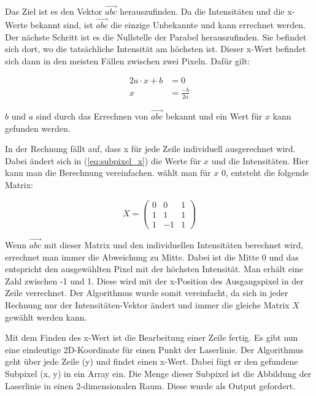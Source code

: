 		Das Ziel ist es den Vektor \( \vec{abc} \) herauszufinden. Da die Intensitäten und die x-Werte bekannt sind, ist \( \vec{abc} \) die einzige Unbekannte und kann errechnet werden. Der nächste Schritt ist es die Nullstelle der Parabel herauszufinden. Sie befindet sich dort, wo die tatsächliche Intensität am höchsten ist. Dieser x-Wert befindet sich dann in den meisten Fällen zwischen zwei Pixeln. Dafür gilt:
		
		\begin{equation}
			\begin{aligned}
				2a \cdot x + b &= 0 \\
				x &= \frac{-b}{2a}
			\end{aligned}
		\end{equation}
	
		\( b \) und \( a \) sind durch das Errechnen von \( \vec{abc} \) bekannt und ein Wert für \( x \) kann gefunden werden.
		
		In der Rechnung fällt auf, dass x für jede Zeile individuell ausgerechnet wird. Dabei ändert sich in (\ref{eq:subpixel_x}) die Werte für \( x \) und die Intensitäten. Hier kann man die Berechnung vereinfachen. wählt man für \( x \) 0, entsteht die folgende Matrix:
		
		\begin{equation}
			X = \begin{pmatrix}
				0 & 0 & 1 \\
				1 & 1 & 1 \\
				1 & -1 & 1
			\end{pmatrix}
		\end{equation}
		
		Wenn \( \vec{abc} \) mit dieser Matrix und den individuellen Intensitäten berechnet wird, errechnet man immer die Abweichung zu Mitte. Dabei ist die Mitte 0 und das entspricht den ausgewählten Pixel mit der höchsten Intensität. Man erhält eine Zahl zwischen -1 und 1. Diese wird mit der x-Position des Ausgangspixel in der Zeile verrechnet. Der Algorithmus wurde somit vereinfacht, da sich in jeder Rechnung nur der Intensitäten-Vektor ändert und immer die gleiche Matrix \( X \) gewählt werden kann.
		
		Mit dem Finden des x-Wert ist die Bearbeitung einer Zeile fertig. Es gibt nun eine eindeutige 2D-Koordinate für einen Punkt der Laserlinie. Der Algorithmus geht über jede Zeile (y) und findet einen x-Wert. Dabei fügt er den gefundene Subpixel (x, y) in ein Array ein. Die Menge dieser Subpixel ist die Abbildung der Laserlinie in einen 2-dimensionalen Raum. Diese wurde als Output gefordert.
		
